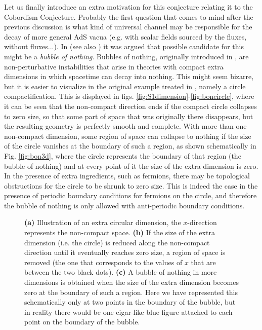 \documentclass[11pt,a4paper]{article}
\begin{document}
Let us finally introduce an extra motivation for this conjecture relating it to the Cobordism Conjecture. Probably the first question that comes to mind after the previous discussion is what kind of universal channel may be responsible for the decay of more general AdS vacua (e.g. with scalar fields sourced by the fluxes, without fluxes...). In \cite{GarciaEtxebarria:2020xsr} (see also \cite{Dibitetto:2020csn}) it was argued that possible candidate for this might be a \emph{bubble of nothing}. Bubbles of nothing, originally introduced in \cite{Witten:1981gj}, are non-perturbative instabilities that arise in theories with compact extra dimensions in which spacetime  can decay into nothing. This might seem bizarre, but it is easier to visualize in the original example treated in \cite{Witten:1981gj}, namely a circle compactification. This is displayed in figs. \ref{fig:S1dimension}-\ref{fig:boncircle}, where it can be seen that the non-compact direction ends if the compact circle collapses to zero size, so that some part of space that was originally there disappears, but the resulting geometry is perfectly smooth and complete. With more than one non-compact dimension, some region of space can collapse to nothing if the size of the circle vanishes at the boundary of such a region, as shown schematically in Fig. \ref{fig:bon3d}, where the circle represents the boundary of that region (the bubble of nothing) and at every point of it the size of the extra dimension is zero. In the presence of extra ingredients, such as fermions, there may be topological obstructions for the circle to be shrunk to zero size. This is indeed the case in the presence of periodic boundary conditions for fermions on the circle, and therefore the bubble of nothing is only allowed with anti-periodic boundary conditions. 

\begin{figure}[t]
	\begin{center}
		\qquad \quad 
		\caption{\footnotesize \textbf{(a)} Illustration of an extra circular dimension, the $x$-direction represents the non-compact space. \textbf{(b)} If  the size of the extra dimension (i.e. the circle) is reduced along the non-compact direction until it eventually reaches zero size, a region of space is removed (the one that corresponds to the values of $x$ that are between the two black dots). \textbf{(c)} A bubble of nothing in more dimensions is obtained when the size of the extra dimension becomes zero at the boundary of such a region. Here we have represented this schematically only at two points in the boundary of the bubble, but in reality there would be one cigar-like blue figure attached to each point on the boundary of the bubble.}
		\label{fig:BONS1}
	\end{center}
\end{figure}  
\end{document}
